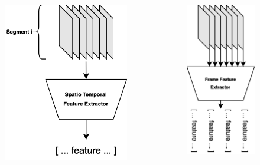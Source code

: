 \begin{frame}

    \begin{columns}
        \begin{column}{0.5\textwidth}
            \begin{figure}
                \centering
                \includegraphics[width=0.65\linewidth]{../../assets/figures/segment-spatio-temporal-feature-extractor.png}
            \end{figure}
        \end{column}
        \begin{column}{0.5\textwidth}
            \begin{figure}
                \centering
                \includegraphics[width=0.40\linewidth]{../../assets/figures/frame-spatio-temporal-feature-extractor.png}
            \end{figure}
        \end{column}
    \end{columns}
\end{frame}

